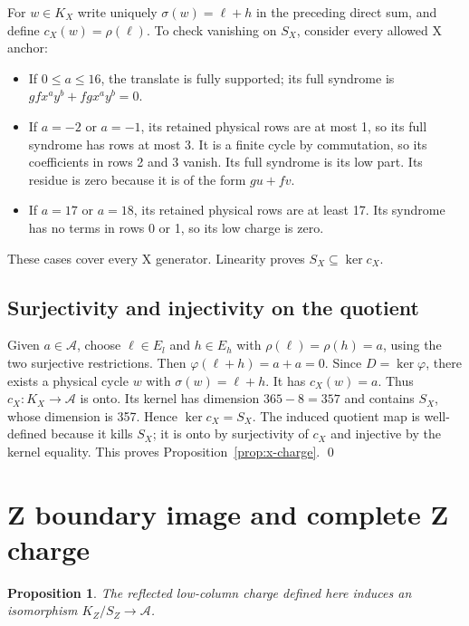 \documentclass{article}
\newtheorem{proposition}{Proposition}
\begin{document}
For \(w \in K_X\) write uniquely \(\sigma(w) = \ell + h\) in the preceding direct sum, and
define \(c_X(w) = \rho(\ell)\). To check vanishing on \(S_X\), consider every allowed X
anchor:
\begin{itemize}
  \item If \(0 \le a \le 16\), the translate is fully supported; its full syndrome is
    \(gf x^a y^b + fg x^a y^b = 0\).
  \item If \(a = -2\) or \(a = -1\), its retained physical rows are at most 1, so its full
    syndrome has rows at most 3. It is a finite cycle by commutation, so its coefficients in
    rows 2 and 3 vanish. Its full syndrome is its low part. Its residue is zero because it is
    of the form \(gu + fv\).
  \item If \(a = 17\) or \(a = 18\), its retained physical rows are at least 17. Its syndrome
    has no terms in rows 0 or 1, so its low charge is zero.
\end{itemize}
These cases cover every X generator. Linearity proves \(S_X \subseteq \ker c_X\).

\subsection{Surjectivity and injectivity on the quotient}\label{sec:x-quotient}

Given \(a \in \mathcal{A}\), choose \(\ell \in E_l\) and \(h \in E_h\) with
\(\rho(\ell) = \rho(h) = a\), using the two surjective restrictions. Then
\(\varphi(\ell + h) = a + a = 0\). Since \(D = \ker \varphi\), there exists a physical cycle
\(w\) with \(\sigma(w) = \ell + h\). It has \(c_X(w) = a\). Thus
\(c_X \colon K_X \to \mathcal{A}\) is onto. Its kernel has dimension \(365 - 8 = 357\) and
contains \(S_X\), whose dimension is 357. Hence \(\ker c_X = S_X\). The induced quotient map
is well-defined because it kills \(S_X\); it is onto by surjectivity of \(c_X\) and injective
by the kernel equality. This proves Proposition~\ref{prop:x-charge}. \qed

\section{Z boundary image and complete Z charge}\label{sec:z-charge}

\begin{proposition}\label{prop:z-charge}
  The reflected low-column charge defined here induces an isomorphism
  \(K_Z/S_Z \to \mathcal{A}\).
\end{proposition}
\end{document}
